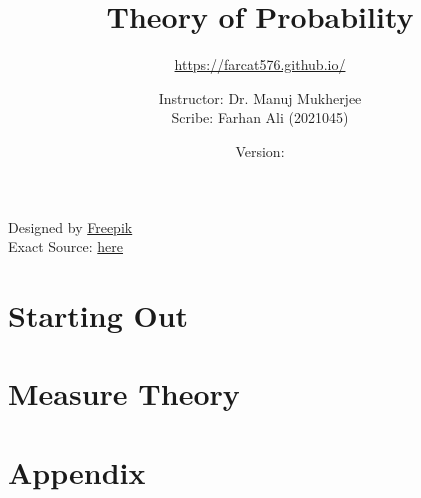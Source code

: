 \documentclass[11pt,twoside=semi,openright,numbers=noenddot,titlepage=false]{scrbook}
\title{Theory of Probability}
\subtitle{\url{https://farcat576.github.io/}}
\author{Instructor: Dr. Manuj Mukherjee \\ Scribe: Farhan Ali (2021045)}
\date{Version: \napkinversion}
\begin{document}
\frontmatter
\maketitle

\bgroup
\fboxrule=4pt
\noindent{}
\begin{center}
	Designed by \href{www.freepik.com}{Freepik} \\
	Exact Source: \href{https://www.freepik.com/free-photo/closeup-abstract-watercolor-background_2768350.htm#fromView=image_search&page=1&position=24&uuid=895fbb9c-0a69-4bd5-ac86-3b253fd9093b}{here}
\end{center}
\egroup
\newpage




\setcounter{chapter}{-1} %


\cleardoublepage
{}
\setcounter{temppage}{\value{page}}
\mainmatter
\setcounter{page}{\value{temppage}}

\tableofcontents


\part{Starting Out}
\label{part:startout}
\parttoc
\setcounter{chapter}{-1} %




\part{Measure Theory}
\label{part:measure}
\parttoc

\part{Appendix}
\parttoc
\appendix







\backmatter

\clearpage
\printbibliography[type=image,title={Image Attributions}]
\printbibliography[nottype=image]
\end{document}
